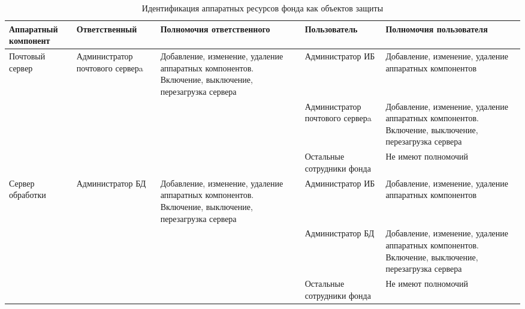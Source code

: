 \label{AppendixA}

\begin{sidewaystable}[h]
\begin{longtable}{|p{}|p{}|
    p{}|p{}|p{}|}
\caption{Идентификация аппаратных ресурсов фонда как объектов
  защиты} 
\label{hardware} \\\hline 

Аппаратный компонент & Ответственный & Полномочия ответственного &
Пользователь & Полномочия пользователя\\\hline

Почтовый сервер
& Администратор почтового серверa
& Добавление, изменение, удаление аппаратных компонентов.
Включение, выключение, перезагрузка сервера
& Администратор ИБ
& Добавление, изменение, удаление аппаратных компонентов\\\cline{4-5}
&&& Администратор почтового серверa
& Добавление, изменение, удаление аппаратных компонентов.
Включение, выключение, перезагрузка сервера \\\cline{4-5}
&&& Остальные сотрудники фонда
& Не имеют полномочий\\\hline

Сервер обработки
& Администратор БД
& Добавление, изменение, удаление аппаратных компонентов.
Включение, выключение, перезагрузка сервера
& Администратор ИБ
& Добавление, изменение, удаление аппаратных компонентов\\\cline{4-5}
&&& Администратор БД
& Добавление, изменение, удаление аппаратных компонентов.
Включение, выключение, перезагрузка сервера \\\cline{4-5}
&&& Остальные сотрудники фонда
& Не имеют полномочий\\\hline
\end{longtable}
\end{sidewaystable}
\newpage

